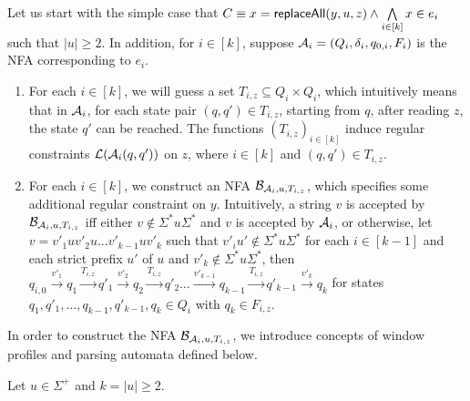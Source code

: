 Let us start with the simple case that $C \equiv x = \mathsf{replaceAll}(y, u, z) \wedge \bigwedge \limits_{i \in [k]} x \in e_{i}$ such that $|u| \ge 2$.  In addition, for $i \in [k]$, suppose $\mathcal{A}_i = (Q_i, \delta_i, q_{0, i}, F_i)$ 
is the NFA corresponding to $e_i$. 
\begin{enumerate}
\item For each $i \in [k]$, we will guess a set $T_{i, z} \subseteq Q_i \times Q_i$, which intuitively means that in $\mathcal{A}_i$, for each state pair $(q, q') \in T_{i, z}$, starting from $q$, after reading $z$, the state $q' $ can be reached. The functions $(T_{i, z})_{i \in [k]}$ induce regular constraints $\mathcal{L}(\mathcal{A}_i(q,q'))$ on $z$, where $i \in [k]$ and $(q,q') \in T_{i, z}$.

\item For each $i \in [k]$, we construct an NFA $\mathcal{B}_{\mathcal{A}_i, u,  T_{i, z}}$, which specifies some additional regular constraint on $y$. Intuitively, a string $v$ is accepted by $\mathcal{B}_{\mathcal{A}_i, u,  T_{i, z}}$ iff either $v \not \in \Sigma^\ast u \Sigma^\ast$ and $v$ is accepted by $\mathcal{A}_i$, or otherwise, let $v = v'_1 u v'_2 u \dots v'_{k-1} u v'_{k}$ such that $v'_i u' \not \in \Sigma^\ast u \Sigma^\ast$ for each $i \in [k-1]$ and each strict prefix $u'$ of $u$ and $v'_k \not \in \Sigma^\ast u \Sigma^\ast$, then $q_{i,0} \xrightarrow{v'_1} q_1 \xrightarrow{T_{i,z}} q'_1 \xrightarrow{v'_2} q_2 \xrightarrow{T_{i,z}} q'_2 \dots \xrightarrow{v'_{k-1}} q_{k-1} \xrightarrow{T_{i,z}} q'_{k-1} \xrightarrow{v'_k} q_k$ for states $q_1, q'_1, \dots, q_{k-1}, q'_{k-1}, q_k \in Q_i$ with $q_k \in F_{i,z}$. 
\end{enumerate}

In order to construct the NFA $\mathcal{B}_{\mathcal{A}_i, u,  T_{i, z}}$, we introduce concepts of window profiles and parsing automata defined below.

Let $u \in \Sigma^+$ and $k=|u| \ge 2$.




